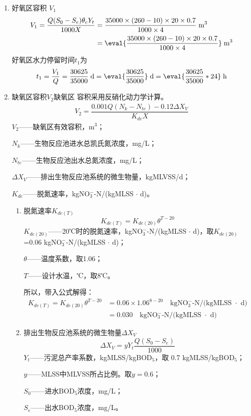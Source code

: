 \begin{enumerate}
	\item 好氧区容积 $V_1$
	\begin{align}
		V_1=\dfrac{Q(S_0-S_e)\theta_c Y_t}{1000X} &=\dfrac{35000\times(260-10)\times 20\times 0.7}{1000 \times 4} \;\text{m$^3$} \\
		&=\eval{\dfrac{35000\times(260-10)\times 20\times 0.7}{1000 \times 4}} \;\text{m$^3$} \notag
	\end{align}
	好氧区水力停留时间$t_1$为
	\begin{align}
		t_1=\dfrac{V_1}{Q}=\dfrac{30625}{35000} \;\text{d} =\eval{\dfrac{30625}{35000}} \;\text{d} =\eval{\dfrac{30625}{35000}*24} \;\text{h}
	\end{align}
	\item 缺氧区容积$V_2$缺氧区 容积采用反硝化动力学计算。
	\begin{align}
		V_2=\dfrac{0.001Q(N_k-N_{te})-0.12\Delta X_V}{K_{de}X}
		\label{eq:Volume of oxidation ditch hypoxic zone}
	\end{align}
	$V_2$——缺氧区有效容积，m$^3$；\par
	$N_k$——生物反应池进水总凯氏氮浓度，mg/L；\par
	$N_{te}$——生物反应池出水总氮浓度，mg/L；\par
	$\Delta X_V$——排出生物反应池系统的微生物量，kgMLVSS/d；\par
	$K_{de}$——脱氮速率，kgNO$_3^-$-N/(kgMLSS $\cdot$ d)。
	\begin{enumerate}
		\item 脱氮速率$K_{de(T)}$
		\begin{equation}
			K_{de(T)}=K_{de(20)}\theta^{T-20}
		\end{equation}
		$K_{de(20)}$——20℃时的脱氮速率，kgNO$_3^-$-N/(kgMLSS $\cdot$ d)，取$K_{de(20)}$=0.06 kgNO$_3^-$-N/(kgMLSS $\cdot$ d)；\par
		$\theta$——温度系数，取1.06；\par
		$T$——设计水温，℃，取8℃。

		所以，带入公式解得：
		\begin{align*}
			K_{de(T)}=K_{de(20)}\theta^{T-20}&=0.06\times 1.06^{8-20} \quad\text{kgNO$_3^-$-N/(kgMLSS $\cdot$ d)} \\ 
			&=0.030 \quad\text{kgNO$_3^-$-N/(kgMLSS $\cdot$ d)}
		\end{align*}

		\item 排出生物反应池系统的微生物量$\Delta X_V$
		\begin{equation}
			\Delta X_V=yY_t\dfrac{Q(S_0-S_e)}{1000}
		\end{equation}
		$Y_t$——污泥总产率系数，kgMLSS/kgBOD$_5$，取 0.7 kgMLSS/kgBOD$_5$；\par
		$y$——MLSS中MLVSS所占比例。取$y=0.6$；\par
		$S_0$——进水BOD$_5$浓度，mg/L；\par
		$S_e$——出水BOD$_5$浓度，mg/L。


\end{enumerate}
\end{enumerate}
